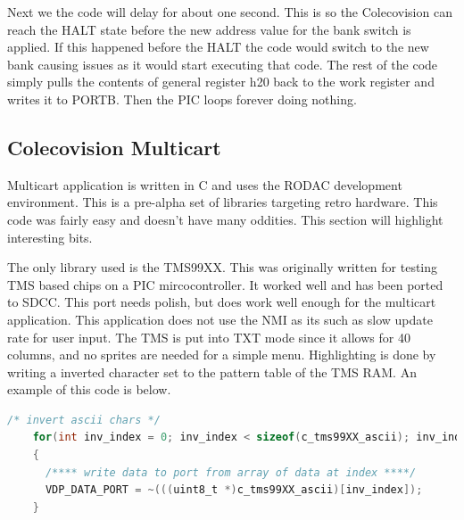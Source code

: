 \documentclass{article}
\begin{document}
  \par
  Next we the code will delay for about one second. This is so the Colecovision can reach the HALT state before the new address value for the
  bank switch is applied. If this happened before the HALT the code would switch to the new bank causing issues as it would start executing
  that code. The rest of the code simply pulls the contents of general register h20 back to the work register and writes it to PORTB. Then
  the PIC loops forever doing nothing.

  \subsection{Colecovision Multicart} \label{Colecovision Multicart}

  \par
  Multicart application is written in C and uses the RODAC development environment. This is a pre-alpha set of libraries targeting retro hardware.
  This code was fairly easy and doesn't have many oddities. This section will highlight interesting bits.

  \par
  The only library used is the TMS99XX. This was originally written for testing TMS based chips on a PIC mircocontroller. It worked well and has been
  ported to SDCC. This port needs polish, but does work well enough for the multicart application. This application does not use the NMI as its such
  as slow update rate for user input. The TMS is put into TXT mode since it allows for 40 columns, and no sprites are needed for a simple menu.
  Highlighting is done by writing a inverted character set to the pattern table of the TMS RAM. An example of this code is below.

  \begin{lstlisting}[language=C]
    /* invert ascii chars */
    for(int inv_index = 0; inv_index < sizeof(c_tms99XX_ascii); inv_index++)
    {
      /**** write data to port from array of data at index ****/
      VDP_DATA_PORT = ~(((uint8_t *)c_tms99XX_ascii)[inv_index]);
    }
  \end{lstlisting}
\end{document}

